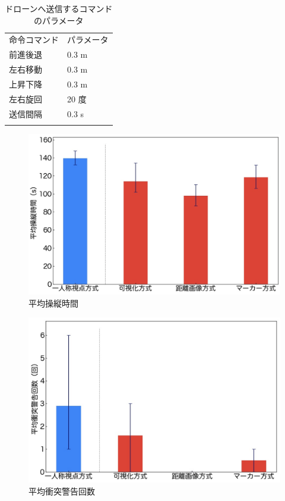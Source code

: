 \documentclass[submit,techrep]{ipsj}
\begin{document}
\begin{table}[tb]
  \caption{ドローンへ送信するコマンドのパラメータ}
  \label{tab:command_parameter}
  \centering
  \begin{tabular}{ll}
    \hline\noalign{\smallskip}
    命令コマンド &  パラメータ       \\
    \noalign{\smallskip}\hline\noalign{\smallskip}
    前進後退     & 0.3 m       \\
    左右移動     & 0.3 m       \\
    上昇下降     & 0.3 m       \\
    左右旋回     & 20 度       \\
    送信間隔     & 0.3 s       \\
    \noalign{\smallskip}\hline
  \end{tabular}
\end{table}

\begin{figure}[tb]
\centering
\includegraphics[width=\linewidth]{img/04_bar1.eps}
\caption{平均操縦時間}
\label{fig:04_bar1}
\end{figure}

\begin{figure}[tb]
\centering
\includegraphics[width=\linewidth]{img/04_bar2.eps}
\caption{平均衝突警告回数}
\label{fig:04_bar2}
\end{figure}
\end{document}
